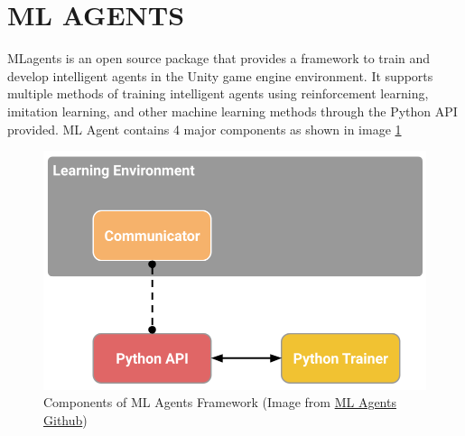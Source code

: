 


\section{ML AGENTS}
MLagents is an open source package that provides a framework to train and develop intelligent agents in the Unity game engine environment. It supports multiple methods of training intelligent agents using reinforcement learning, imitation learning, and other machine learning methods through the Python API provided. ML Agent contains 4 major components as shown in image \ref{fig:mlagents}

\begin{figure}[H]
    \centering
    \includegraphics[width=1.0\textwidth]{images/mlagents.png}
    \caption{Components of ML Agents Framework (Image from \href{https://github.com/Unity-Technologies/ml-agents}{ML Agents Github})}
    \label{fig:mlagents}
\end{figure}

